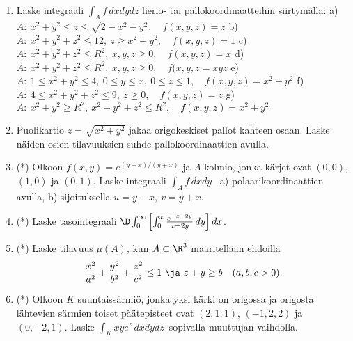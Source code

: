 \begin{enumerate}
\item 
Laske integraali $\int_A f\,dxdydz$ lieriö- tai pallokoordinaatteihin
siirtymällä: \vspace{1mm}\newline
a)\ \ $A:\ x^2+y^2 \le z \le \sqrt{2-x^2-y^2}, \quad f(x,y,z)=z$ \newline
b)\ \ $A:\ x^2+y^2+z^2 \le 12,\ z \ge x^2+y^2, \quad f(x,y,z)=1$ \newline
c)\ \ $A:\ x^2+y^2+z^2 \le R^2,\ x,y,z \ge 0, \quad f(x,y,z)=x$ \newline
d)\ \ $A:\ x^2 + y^2 + z^2 \le R^2,\ x,y,z\ge 0, \quad f(x,y,z=xyz$ \newline
e)\ \ $A:\ 1 \le x^2+y^2 \le 4,\ 0 \le y \le x,\ 0 \le z \le 1, \quad f(x,y,z)=x^2+y^2$ \newline
f)\,\ \ $A:\ 4 \le x^2+y^2+z^2 \le 9,\ z \ge 0, \quad f(x,y,z)=z$ \newline
g)\ \ $A:\ x^2+y^2 \ge R^2,\ x^2+y^2+z^2 \le R^2, \quad f(x,y,z)=x^2+y^2$

\item 
Puolikartio $z=\sqrt{x^2+y^2}$ jakaa origokeskiset pallot kahteen osaan. Laske näiden
osien tilavuuksien suhde pallokoordinaattien avulla.

\item (*)
Olkoon $f(x,y)=e^{(y-x)/(y+x)}$ ja $A$ kolmio, jonka kärjet ovat $(0,0)$, $(1,0)$ ja $(0,1)$.
Laske integraali $\int_A f\,dxdy$ \ a) polaarikoordinaattien avulla, \linebreak
b) sijoituksella $u=y-x,\ v=y+x$.

\item (*)
Laske tasointegraali $\D \int_0^\infty\left[\int_0^x \frac{e^{-x-2y}}{x+2y}\,dy\right]dx$.

\item (*)
Laske tilavuus $\mu(A)$, kun $A\subset\R^3$ määritellään ehdoilla
\[
\frac{x^2}{a^2}+\frac{y^2}{b^2}+\frac{z^2}{c^2} \le 1\ \ja\ z+y \ge b \quad (a,b,c>0).
\]

\item (*)
Olkoon $K$ suuntaissärmiö, jonka yksi kärki on origossa ja origosta lähtevien särmien toiset
päätepisteet ovat $(2,1,1)$, $(-1,2,2)$ ja $(0,-2,1)$. Laske $\int_K xye^z\,dxdydz\,$ sopivalla
muuttujan vaihdolla.

\end{enumerate} 